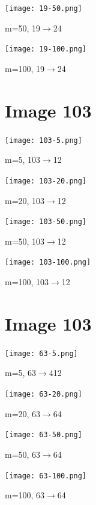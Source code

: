 \documentclass{article}
\begin{document}
\begin{center}
    \texttt{[image: 19-50.png]}
    \caption{m=50, 19$\rightarrow$24}
\end{center}

\begin{center}
    \texttt{[image: 19-100.png]}
    \caption{m=100, 19$\rightarrow$24}
\end{center}

\section{Image 103}

\begin{center}
    \texttt{[image: 103-5.png]}
    \caption{m=5, 103$\rightarrow$12}
\end{center}

\begin{center}
    \texttt{[image: 103-20.png]}
    \caption{m=20, 103$\rightarrow$12}
\end{center}

\begin{center}
    \texttt{[image: 103-50.png]}
    \caption{m=50, 103$\rightarrow$12}
\end{center}

\begin{center}
    \texttt{[image: 103-100.png]}
    \caption{m=100, 103$\rightarrow$12}
\end{center}

\section{Image 103}

\begin{center}
    \texttt{[image: 63-5.png]}
    \caption{m=5, 63$\rightarrow$412}
\end{center}

\begin{center}
    \texttt{[image: 63-20.png]}
    \caption{m=20, 63$\rightarrow$64}
\end{center}

\begin{center}
    \texttt{[image: 63-50.png]}
    \caption{m=50, 63$\rightarrow$64}
\end{center}

\begin{center}
    \texttt{[image: 63-100.png]}
    \caption{m=100, 63$\rightarrow$64}
\end{center}
\end{document}
